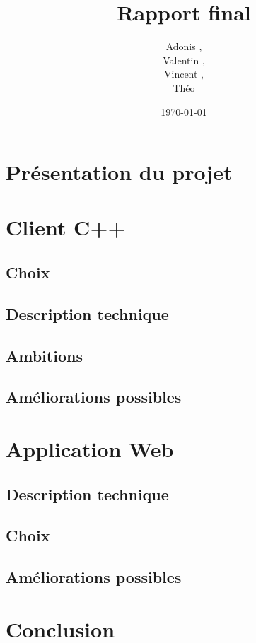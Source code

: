 \documentclass[a4paper]{article}
\title{Rapport final}
\author{Adonis \bsc{Najimi},\\
 Valentin \bsc{Stern},\\
 Vincent \bsc{Albert},\\
 Théo \bsc{Gerriet}}
\date{\today}
\begin{document}
\maketitle
\newpage

\section{Présentation du projet}


\section{Client C++}
		\subsection{Choix}
    
		
    \subsection{Description technique}
    

    \subsection{Ambitions}
    
    
    \subsection{Améliorations possibles}
    

\newpage
\section{Application Web}
	\subsection{Description technique}
	
	\subsection{Choix}
	
	\subsection{Améliorations possibles}
	
	
\newpage
\section{Conclusion}
	

\newpage
\tableofcontents
\end{document}
